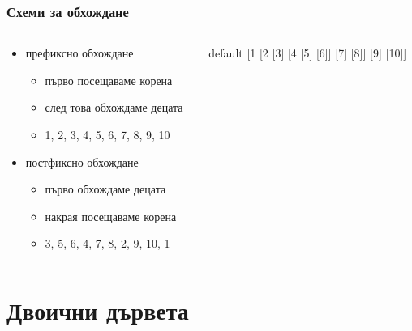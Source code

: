 \documentclass[alsotrans,beameroptions={aspectratio=169}]{beamerswitch}
\newcommand{\sampletree}{%
  \begin{forest} default
    [1 [2 [3] [4 [5] [6]] [7] [8]] [9] [10]]
  \end{forest}%
}
\begin{document}
\begin{frame}
  \frametitle{Схеми за обхождане}
  \begin{columns}[c]
    \begin{column}{0.65\textwidth}
      \begin{itemize}
      \item префиксно обхождане
        \begin{itemize}
        \item първо посещаваме корена
        \item след това обхождаме децата
          \pause
        \item 1, 2, 3, 4, 5, 6, 7, 8, 9, 10
        \end{itemize}
        \pause
      \item постфиксно обхождане
        \begin{itemize}
        \item първо обхождаме децата
        \item накрая посещаваме корена
          \pause
        \item 3, 5, 6, 4, 7, 8, 2, 9, 10, 1
        \end{itemize}
      \end{itemize}
    \end{column}
    \begin{column}{0.35\textwidth}
      \begin{center}
        \sampletree
      \end{center}
    \end{column}
  \end{columns}
\end{frame}

\section{Двоични дървета}
\end{document}
